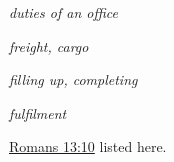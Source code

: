 \begin{compactdesc}
\begin{compactitem}
							\item[I.9] \textit{duties of an office}
							\item[I.10] \textit{freight, cargo}
							\item[II.1] \textit{filling up, completing}
							\item[II.2] \textit{fulfilment}
								\begin{compactitem}
									\item \hyperref[ROMANS-13-10]{Romans 13:10} listed here.
								\end{compactitem}
						\end{compactitem}
				\end{compactdesc}
				
				
				
		
	
		
		
	
		
